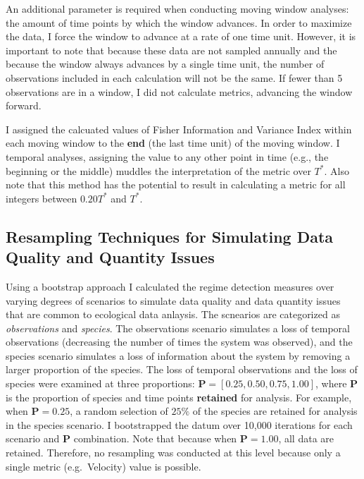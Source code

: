 \documentclass[12pt,twoside,openany]{reedthesis}
\begin{document}
An additional parameter is required when conducting moving window
analyses: the amount of time points by which the window advances. In
order to maximize the data, I force the window to advance at a rate of
one time unit. However, it is important to note that because these data
are not sampled annually and the because the window always advances by a
single time unit, the number of observations included in each
calculation will not be the same. If fewer than 5 observations are in a
window, I did not calculate metrics, advancing the window forward.

I assigned the calcuated values of Fisher Information and Variance Index
within each moving window to the \textbf{end} (the last time unit) of
the moving window. I temporal analyses, assigning the value to any other
point in time (e.g., the beginning or the middle) muddles the
interpretation of the metric over \(T^*\). Also note that this method
has the potential to result in calculating a metric for all integers
between \(0.20 T^*\) and \(T^*\).

\subsection{Resampling Techniques for Simulating Data Quality and
Quantity
Issues}\label{resampling-techniques-for-simulating-data-quality-and-quantity-issues}

Using a bootstrap approach I calculated the regime detection measures
over varying degrees of scenarios to simulate data quality and data
quantity issues that are common to ecological data anlaysis. The
scnearios are categorized as \emph{observations} and \emph{species}. The
observations scenario simulates a loss of temporal observations
(decreasing the number of times the system was observed), and the
species scenario simulates a loss of information about the system by
removing a larger proportion of the species. The loss of temporal
observations and the loss of species were examined at three proportions:
\(\textbf{P} = [0.25, 0.50, 0.75, 1.00]\), where \(\textbf{P}\) is the
proportion of species and time points \textbf{retained} for analysis.
For example, when \(\textbf{P} = 0.25\), a random selection of \(25\%\)
of the species are retained for analysis in the species scenario. I
bootstrapped the datum over 10,000 iterations for each scenario and
\(\textbf{P}\) combination. Note that because when
\(\textbf{P} = 1.00\), all data are retained. Therefore, no resampling
was conducted at this level because only a single metric (e.g.~Velocity)
value is possible.
\end{document}
